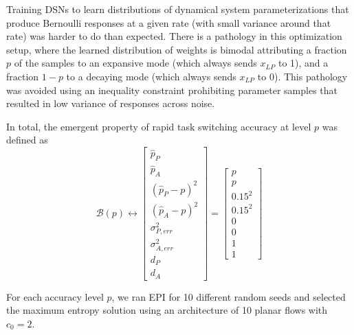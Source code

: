 \documentclass[11pt]{article}
\begin{document}
Training DSNs to learn distributions of dynamical system parameterizations that produce Bernoulli responses at a given rate (with small variance around that rate) was harder to do than expected.  There is a pathology in this optimization setup, where the learned distribution of weights is bimodal attributing a fraction $p$ of the samples to an expansive mode (which always sends $x_{LP}$ to 1), and a fraction $1-p$ to a decaying mode (which always sends $x_{LP}$ to 0).  This pathology was avoided using an inequality constraint prohibiting parameter samples that resulted in low variance of responses across noise.

In total, the emergent property of rapid task switching accuracy at level $p$ was defined as
\begin{equation}
\mathcal{B}(p) \leftrightarrow \begin{bmatrix} \hat{p}_P \\ \hat{p}_A \\ (\hat{p}_P-p)^2 \\ (\hat{p}_A - p)^2 \\ \sigma^2_{P,err} \\ \sigma^2_{A,err} \\ d_P \\ d_A \end{bmatrix} = \begin{bmatrix} p \\ p \\ 0.15^2 \\ 0.15^2 \\ 0 \\ 0 \\ 1 \\ 1 \end{bmatrix}
\end{equation}

For each accuracy level $p$, we ran EPI for 10 different random seeds and selected the maximum entropy solution using an architecture of 10 planar flows with $c_0 = 2$. 
\end{document}
